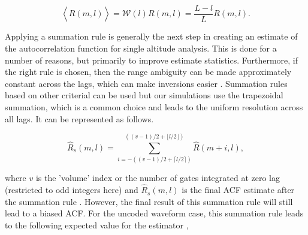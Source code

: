 \documentclass[draft,ras]{agutex}
\begin{document}
\begin{article}
\begin{equation}
\label{eq:lagprobias}
\left\langle\widehat{R}(m,l) \right\rangle = \mathcal{W}(l)R(m,l) =\frac{L-l}{L}R(m,l).
\end{equation}
%
%

Applying a summation rule is generally the next step in creating an estimate of the autocorrelation function for single altitude analysis. This is done for a number of reasons, but primarily to improve estimate statistics.  Furthermore, if the right rule is chosen, then the range ambiguity can be made approximately constant across the lags, which can make inversions easier \citep{nygren1996}. Summation rules based on other criterial can be used but our simulations use the trapezoidal summation, which is a common choice and leads to the uniform resolution across all lags. It can be represented as follows.

\begin{equation}
\label{eq:sumrule}
\widehat{R}_s(m,l) = \displaystyle\sum\limits_{i=-((v-1)/2+\lceil l/2 \rceil)}^{((v-1)/2+\lfloor l/2\rfloor)} \widehat{R}(m+i,l),
\end{equation}

\noindent where $v$ is the 'volume' index or the number of gates integrated at zero lag (restricted to odd integers here) and $\widehat{R}_s(m,l)$ is the final ACF estimate after the summation rule \citep{nygren1996}. 
However, the final result of this summation rule will still lead to a biased ACF. For the uncoded waveform case, this summation rule leads to the following expected value for the estimator \citep{nygren1996},


\end{article}
\end{document}
